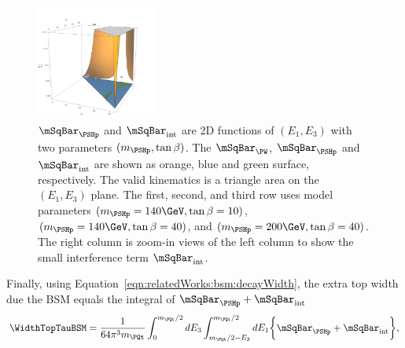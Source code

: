 \begin{figure}[ht]
    \includegraphics[width=0.35\textwidth]{chapters/RelatedWorks/sectionBSM/figures/zoom_2HDM_200_40.png}
    \caption{  $\mSqBar _{\PSHp}$ and $ \mSqBar _{\mathrm{int}}$ are 2D functions of $(E_1, E_3)$ with two parameters $(m_{\PSHp}, \tan\beta)$. The $\mSqBar _{\PW}$, $\mSqBar _{\PSHp} $ and $\mSqBar _{\mathrm{int}}$ are shown as orange, blue and green surface, respectively. The valid kinematics is a triangle area on the $(E_1, E_3)$  plane. The first, second, and third row uses model parameters $(m_{\PSHp} = 140 \GeV, \tan\beta=10)$, $(m_{\PSHp} = 140 \GeV, \tan\beta=40)$, and $(m_{\PSHp} = 200 \GeV, \tan\beta=40)$. The right column is zoom-in views of the left column to show the small interference term $ \mSqBar _{\mathrm{int}}$.}
    \label{fig:relatedWorks:bsm:chargedHiggs:m2}
\end{figure}




Finally, using Equation~\ref{eqn:relatedWorks:bsm:decayWidth}, the extra top width due the BSM \PSHp equals the integral of  $\mSqBar _{\PSHp} +  \mSqBar _{\mathrm{int}}$
\begin{equation}
	\WidthTopTauBSM = \frac{1}{64 \pi^3 m_\PQt} \int_{0}^{m_\PQt/2} dE_3 \int_{m_\PQt/2-E_3}^{m_\PQt/2} dE_1  \bigg\{ \mSqBar _{\PSHp} +  \mSqBar_{\mathrm{int}}  \bigg \},
\end{equation}


